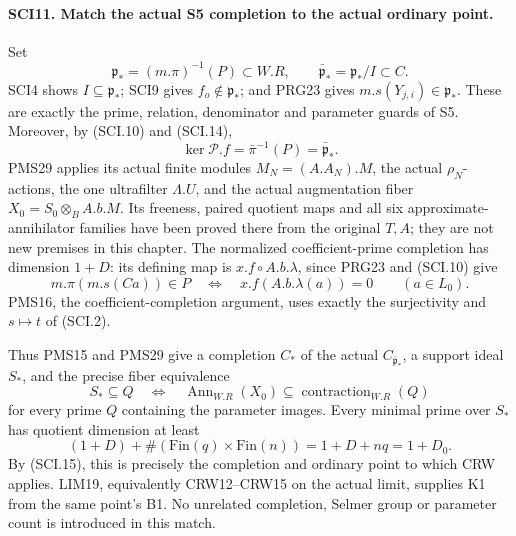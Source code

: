 \paragraph{SCI11. Match the actual S5 completion to the actual ordinary point.}
\label{claim:SCI11}
Set
\[
 \mathfrak p_*=(m.\pi)^{-1}(P)\subset W.R,\qquad
 \bar{\mathfrak p}_*=\mathfrak p_*/I\subset C.
\]
SCI4 shows \(I\subseteq\mathfrak p_*\); SCI9 gives
\(f_o\notin\mathfrak p_*\); and PRG23 gives
\(m.s(Y_{j,i})\in\mathfrak p_*\). These are exactly the
prime, relation, denominator and parameter guards of S5.
Moreover, by (SCI.10) and (SCI.14),
\[
 \ker\mathcal P.f=\bar\pi^{-1}(P)=\bar{\mathfrak p}_*.
 \tag{SCI.15}
\]
PMS29 applies its actual finite modules
\(M_N=(A.A_N).M\), the actual \(\rho_N\)-actions, the one
ultrafilter \(\Lambda.U\), and the actual augmentation fiber
\(X_0=S_0\otimes_B A.b.M\). Its freeness, paired quotient
maps and all six approximate-annihilator families have been
proved there from the original \(T,A\); they are not new
premises in this chapter. The normalized coefficient-prime
completion has dimension \(1+D\): its defining map is
\(x.f\circ A.b.\lambda\), since PRG23 and (SCI.10) give
\[
 m.\pi(m.s(Ca))\in P
       \quad\Longleftrightarrow\quad
 x.f(A.b.\lambda(a))=0\qquad(a\in L_0).                  \tag{SCI.16}
\]
PMS16, the coefficient-completion argument, uses exactly the
surjectivity and \(s\mapsto t\) of (SCI.2).

Thus PMS15 and PMS29 give a completion \(C_*\) of the actual
\(C_{\bar{\mathfrak p}_*}\), a support ideal \(S_*\), and
the precise fiber equivalence
\[
 S_*\subseteq Q
 \quad\Longleftrightarrow\quad
 \operatorname{Ann}_{W.R}(X_0)
       \subseteq\operatorname{contraction}_{W.R}(Q)        \tag{SCI.17}
\]
for every prime \(Q\) containing the parameter images.
Every minimal prime over \(S_*\) has quotient dimension at
least
\[
 (1+D)+\#(\mathrm{Fin}(q)\times\mathrm{Fin}(n))
        =1+D+nq=1+D_0.                                   \tag{SCI.18}
\]
By (SCI.15), this is precisely the completion and ordinary
point to which CRW applies. LIM19, equivalently CRW12--CRW15
on the actual limit, supplies K1 from the same point's B1.
No unrelated completion, Selmer group or parameter count is
introduced in this match.

